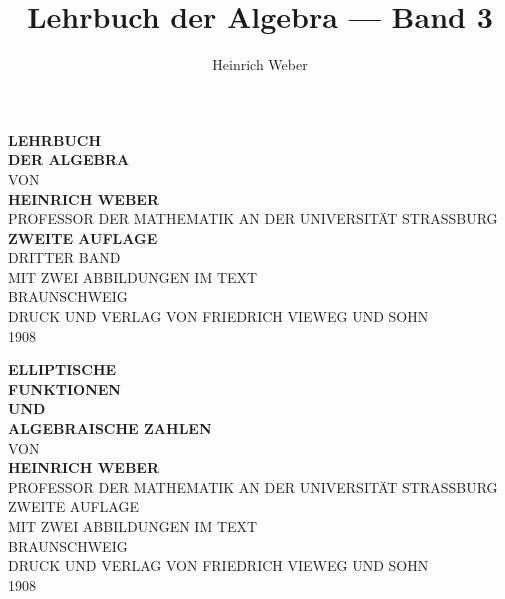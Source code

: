 \documentclass[12pt,a4paper]{book}
\title{\Huge\bfseries Lehrbuch der Algebra --- Band 3}
\author{\Large Heinrich Weber}
\date{}
\theoremstyle{definition}
\begin{document}
\frontmatter
\thispagestyle{empty}

\begin{titlepage}
\begin{center}
\vspace*{3cm}

{\Huge\bfseries LEHRBUCH\\[0.5em]
DER ALGEBRA}\\[2cm]

{\Large VON}\\[0.5cm]

{\LARGE\bfseries HEINRICH WEBER}\\[0.3cm]
{\large PROFESSOR DER MATHEMATIK AN DER UNIVERSIT\"AT STRASSBURG}\\[2cm]

{\Large\bfseries ZWEITE AUFLAGE}\\[0.5cm]
{\Large DRITTER BAND}\\[1.5cm]

{\large MIT ZWEI ABBILDUNGEN IM TEXT}\\[2cm]

{\large BRAUNSCHWEIG}\\
{\large DRUCK UND VERLAG VON FRIEDRICH VIEWEG UND SOHN}\\[0.5cm]
{\large 1908}

\end{center}
\end{titlepage}

\thispagestyle{empty}
\begin{center}
\vspace*{3cm}

{\Huge\bfseries ELLIPTISCHE\\[0.5em]
FUNKTIONEN\\[0.5em]
UND\\[0.5em]
ALGEBRAISCHE ZAHLEN}\\[2cm]

{\Large VON}\\[0.5cm]

{\LARGE\bfseries HEINRICH WEBER}\\[0.3cm]
{\large PROFESSOR DER MATHEMATIK AN DER UNIVERSIT\"AT STRASSBURG}\\[2cm]

{\Large ZWEITE AUFLAGE}\\[0.5cm]
{\large MIT ZWEI ABBILDUNGEN IM TEXT}\\[2cm]

{\large BRAUNSCHWEIG}\\
{\large DRUCK UND VERLAG VON FRIEDRICH VIEWEG UND SOHN}\\[0.5cm]
{\large 1908}

\end{center}
\cleardoublepage
\end{document}

